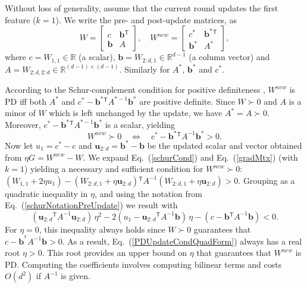 \documentclass[twoside,11pt]{article}
\newcommand\mat[1]{{#1}}
\renewcommand\vec[1]{\mathbf{#1}}
\newcommand{\T}{{}^\mathsf{T}}
\newcommand{\W}{\mat{W}}
\newcommand{\newW}{{\mat{W^{new}}}}
\newcommand{\R}{\mathbb{R}}
\newcommand{\B}{\vec{b}}
\newcommand{\C}{c}
\newcommand{\invA}{A^{-1}}
\newcommand{\uscalar}{{u}_{1}}
\newcommand{\uvec}{\vec{u}_{2:d}}
\newcommand{\Wvec}{\W_{2:d,1}}
\newcommand{\Wscalar}{\W_{1,1}}
\renewcommand{\eqref}[1]{Eq.~(\ref{#1})}
\begin{document}
Without loss of generality, assume that the current round updates the first feature ($k = 1$). We write the pre- and post-update
matrices, as
\begin{equation}
  \W = \left[ \begin{matrix} \C & \B\T \\ \B & A \end{matrix} \right],
  \quad
  \newW = \left[ \begin{matrix} \C^* & \B^*\T \\ \B^* & A^* \end{matrix} \right],
  \label{schurNotationPreUpdate}
\end{equation}
 where $\C = \Wscalar \in \R$ (a scalar), $\B = \Wvec \in
\R^{d-1}$ (a column vector) and $A = \W_{2:d,2:d} \in \R^{(d-1)
\times (d-1)}$. Similarly for $A^*$, $\B^*$ and $\C^*$.

According to the Schur-complement condition for positive definiteness
\citep[p. 650]{boyd2004convex}, $\newW$ is PD iff both
$A^*$ and $\C^* - \B^*\T A^{*-1} \B^*$ are positive definite.
Since $W \succ 0$ and $A$ is a minor of $\W$ which is left unchanged by the update, we have $A^* =
A \succ 0$. Moreover, $\C^* - \B^*\T A^{*-1} \B^*$ is a
scalar, yielding
\begin{equation}
  \newW \succ  0 \quad \Leftrightarrow \quad  \C^* - \B^*\T \invA \B^* >  0.
  \label{schurCond}
\end{equation}
Now let $\uscalar = \C^* - \C$ and $\uvec = \B^* - \B$ be the updated scalar and vector
obtained from $\eta G = \newW - \W$. We expand \eqref{schurCond} and
\eqref{gradMtx} (with $k=1$) yielding a necessary and sufficient condition for $\newW \succ 0$: $(\Wscalar + 2\eta \uscalar)-(\Wvec + \eta \uvec)\T \invA (\Wvec + \eta \uvec)   > 0$.
Grouping as a quadratic inequality in $\eta$, and using the notation from \eqref{schurNotationPreUpdate} we result with
\begin{equation}
\label{PDUpdateCondQuadForm}
(\uvec\T \invA \uvec) \, \eta^2 
-2(\uscalar - \uvec\T \invA \B) \,\eta 
-(\C - \B\T  \invA \B) < 0 .
\end{equation}
For $\eta = 0$, this inequality always
holds since $\W \succ 0$ guarantees that $\C-\B^{\T} \invA \B >0$. As a result,
 \eqref{PDUpdateCondQuadForm} always has a real
root $\eta > 0$. This root provides an upper bound on $\eta$ that guarantees that $\newW$ is PD. Computing the coefficients involves computing bilinear terms and costs $O(d^2)$ if $\invA$ is given.
\end{document}
